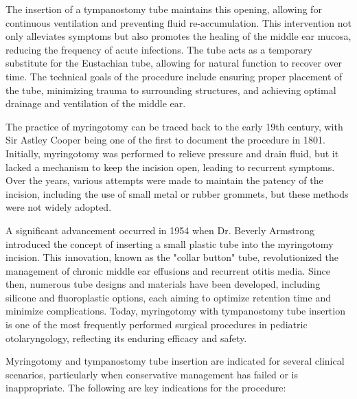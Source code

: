 The insertion of a tympanostomy tube maintains this opening, allowing for continuous ventilation and preventing fluid re-accumulation. This intervention not only alleviates symptoms but also promotes the healing of the middle ear mucosa, reducing the frequency of acute infections. The tube acts as a temporary substitute for the Eustachian tube, allowing for natural function to recover over time. The technical goals of the procedure include ensuring proper placement of the tube, minimizing trauma to surrounding structures, and achieving optimal drainage and ventilation of the middle ear.

The practice of myringotomy can be traced back to the early 19th century, with Sir Astley Cooper being one of the first to document the procedure in 1801. Initially, myringotomy was performed to relieve pressure and drain fluid, but it lacked a mechanism to keep the incision open, leading to recurrent symptoms. Over the years, various attempts were made to maintain the patency of the incision, including the use of small metal or rubber grommets, but these methods were not widely adopted.

A significant advancement occurred in 1954 when Dr. Beverly Armstrong introduced the concept of inserting a small plastic tube into the myringotomy incision. This innovation, known as the "collar button" tube, revolutionized the management of chronic middle ear effusions and recurrent otitis media. Since then, numerous tube designs and materials have been developed, including silicone and fluoroplastic options, each aiming to optimize retention time and minimize complications. Today, myringotomy with tympanostomy tube insertion is one of the most frequently performed surgical procedures in pediatric otolaryngology, reflecting its enduring efficacy and safety.

Myringotomy and tympanostomy tube insertion are indicated for several clinical scenarios, particularly when conservative management has failed or is inappropriate. The following are key indications for the procedure:

